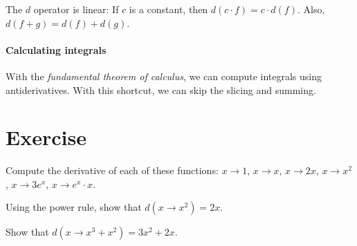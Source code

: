 The \(d\) operator is linear:
If \(c\) is a constant, then \(d(c \cdot f) = c \cdot d(f)\).
Also, \(d(f+g) = d(f) + d(g)\).

\paragraph{Calculating integrals}

With the \emph{fundamental theorem of calculus},
we can compute integrals using antiderivatives.
With this shortcut, we can skip the slicing and summing.


\section{Exercise}

Compute the derivative of each of these functions:
\( x \to 1 \), \( x \to x \), \( x \to 2x \), \( x \to x^2 \),
\( x \to 3e^x \), \(x \to e^x \cdot x \).

Using the power rule, show that \( d(x \to x^2) = 2x \).

Show that \( d(x \to x^3 + x^2) = 3x^2 + 2x \).
